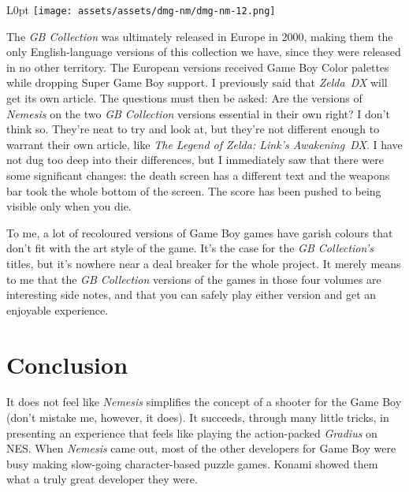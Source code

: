 \documentclass{book}
\let\oldcenter\center
\let\oldendcenter\endcenter
\renewenvironment{center}{\setlength\topsep{0pt}\oldcenter}{\oldendcenter}
\begin{document}
\begin{wrapfigure}{L}{0pt} \texttt{[image: assets/assets/dmg-nm/dmg-nm-12.png]}\end{wrapfigure}
The \emph{GB Collection} was ultimately released in Europe in 2000, making them the only English-language versions of this collection we have, since they were released in no other territory. The European versions received Game Boy Color palettes while dropping Super Game Boy support. I previously said that \emph{Zelda~DX} will get its own article. The questions must then be asked: Are the versions of \emph{Nemesis} on the two \emph{GB Collection} versions essential in their own right? I don’t think so. They’re neat to try and look at, but they’re not different enough to warrant their own article, like \emph{The Legend of Zelda: Link’s Awakening~DX}. I have not dug too deep into their differences, but I immediately saw that there were some significant changes: the death screen has a different text and the weapons bar took the whole bottom of the screen. The score has been pushed to being visible only when you die.

\begin{center}
\quad\vspace{4pt}
\quad\vspace{4pt}
\end{center}

To me, a lot of recoloured versions of Game Boy games have garish colours that don’t fit with the art style of the game. It’s the case for the \emph{GB Collection’s} titles, but it’s nowhere near a deal breaker for the whole project. It merely means to me that the \emph{GB Collection} versions of the games in those four volumes are interesting side notes, and that you can safely play either version and get an enjoyable experience.

\FloatBarrier\needspace{10mm}\section*{Conclusion}\nopagebreak[4]

It does not feel like \emph{Nemesis} simplifies the concept of a shooter for the Game Boy (don’t mistake me, however, it does). It succeeds, through many little tricks, in presenting an experience that feels like playing the action-packed \emph{Gradius} on NES. When \emph{Nemesis} came out, most of the other developers for Game Boy were busy making slow-going character-based puzzle games. Konami showed them what a truly great developer they were.
\end{document}
